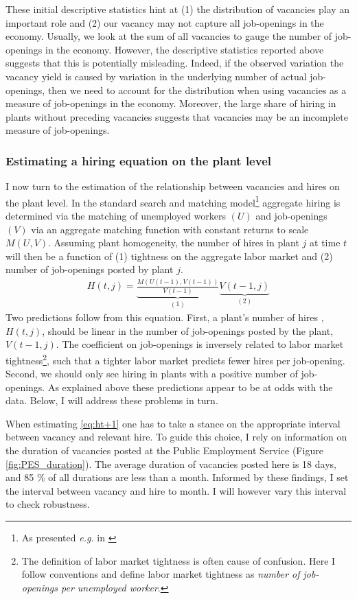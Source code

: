 These initial descriptive statistics hint at (1) the distribution of vacancies play an important role and (2) our vacancy may not capture all job-openings in the economy. Usually, we look at the sum of all vacancies to gauge the number of job-openings in the economy. However, the descriptive statistics reported above suggests that this is potentially misleading. Indeed, if the observed variation the vacancy yield is caused by variation in the underlying number of actual job-openings, then we need to account for the distribution when using vacancies as a measure of job-openings in the economy. Moreover, the large share of hiring in plants without preceding vacancies suggests that vacancies may be an incomplete measure of job-openings.

\subsubsection{Estimating a hiring equation on the plant level}

I now turn to the estimation of the relationship between vacancies and hires on the plant level. In the standard search and matching model\footnote{As presented \emph{e.g.} in \cite{Pissarides2000}} aggregate hiring is determined via the matching of unemployed workers $(U)$ and job-openings $(V)$ via an aggregate matching function with constant returns to scale $M(U,V)$. Assuming plant homogeneity, the number of hires in plant $j$ at time $t$ will then be a function of (1) tightness on the aggregate labor market and (2) number of job-openings posted by plant $j$.
\begin{align}
H(t, j)=\underbrace{\frac{M(U(t-1),V(t-1))}{V(t-1)}}_{(1)} \underbrace{V(t-1,j)}_{(2)}
\label{eq:ht+1}
\end{align}
Two predictions follow from this equation. First, a plant's number of hires , $H(t,j)$, should be linear in the number of job-openings posted by the plant, $V(t-1,j)$. The coefficient on job-openings is inversely related to labor market tightness\footnote{The definition of labor market tightness is often cause of confusion. Here I follow conventions and define labor market tightness as \emph{number of job-openings per unemployed worker}.}, such that a tighter labor market predicts fewer hires per job-opening.
Second, we should only see hiring in plants with a positive number of job-openings. As explained above these predictions appear to be at odds with the data. Below, I will address these problems in turn.

When estimating \ref{eq:ht+1} one has to take a stance on the appropriate interval between vacancy and relevant hire. To guide this choice, I rely on information on the duration of vacancies posted at the Public Employment Service (Figure \ref{fig:PES_duration}). The average duration of vacancies posted here is 18 days, and 85 \% of all durations are less than a month. Informed by these findings, I set the interval between vacancy and hire to month. I will however vary this interval to check robustness.

